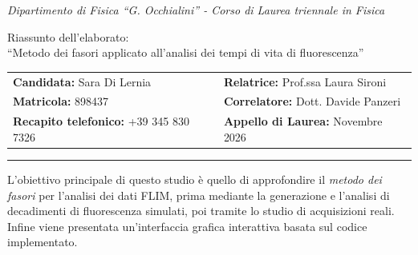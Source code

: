 \documentclass[a4paper, 11pt]{article}
\begin{document}



\textit{\small{Dipartimento di Fisica ``G. Occhialini'' - Corso di Laurea triennale in Fisica}}\\
\vspace{-10pt}
\begin{center}
\normalsize{Riassunto dell'elaborato:}\\
\medskip
\Large{``Metodo dei fasori applicato all'analisi dei tempi di vita di fluorescenza''}
\vspace{0.4cm}
\normalsize

\noindent
\begin{tabular*}{\textwidth}{@{\extracolsep{\fill}}ll@{}}
    \textbf{Candidata:} Sara Di Lernia & \textbf{Relatrice:} Prof.ssa Laura Sironi \\
    \textbf{Matricola:} 898437 & \textbf{Correlatore:} Dott. Davide Panzeri \\
    \textbf{Recapito telefonico:} +39 345 830 7326 & \textbf{Appello di Laurea:} Novembre 2026 \\
\end{tabular*}

\vspace{0.2cm}
\hrule
\vspace{0.4cm}


\normalsize

\end{center}

\vspace{-5pt}

\noindent L'obiettivo principale di questo studio è quello di approfondire il \textit{metodo dei fasori} per l'analisi dei dati FLIM, prima mediante la generazione e l'analisi di decadimenti di fluorescenza simulati, poi tramite lo studio di acquisizioni reali. Infine viene presentata un'interfaccia grafica interattiva basata sul codice implementato.
\end{document}
